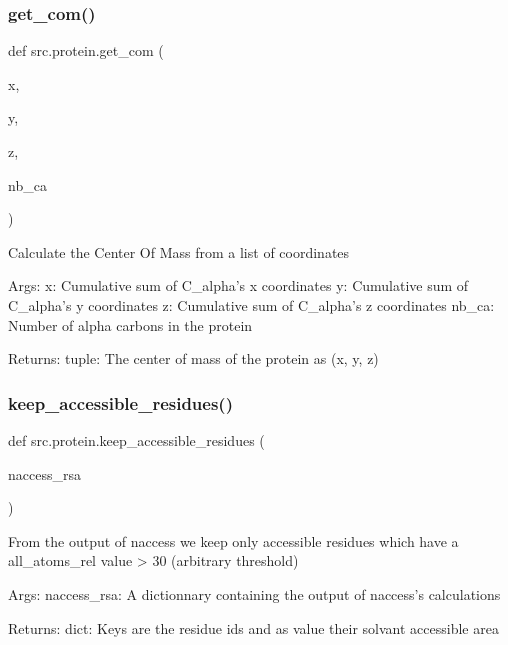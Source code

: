 \subsubsection{\texorpdfstring{get\+\_\+com()}{get\_com()}}
{\footnotesize\ttfamily def src.\+protein.\+get\+\_\+com (\begin{DoxyParamCaption}\item[{}]{x,  }\item[{}]{y,  }\item[{}]{z,  }\item[{}]{nb\+\_\+ca }\end{DoxyParamCaption})}

\begin{DoxyVerb}Calculate the Center Of Mass from a list of coordinates

Args:
    x: Cumulative sum of C_alpha's x coordinates
    y: Cumulative sum of C_alpha's y coordinates
    z: Cumulative sum of C_alpha's z coordinates
    nb_ca: Number of alpha carbons in the protein

Returns:
    tuple: The center of mass of the protein as (x, y, z)\end{DoxyVerb}
 \mbox{\label{namespacesrc_1_1protein_a61ac829ce9a95bc584eb90e83b8463c9}} 
\subsubsection{\texorpdfstring{keep\+\_\+accessible\+\_\+residues()}{keep\_accessible\_residues()}}
{\footnotesize\ttfamily def src.\+protein.\+keep\+\_\+accessible\+\_\+residues (\begin{DoxyParamCaption}\item[{}]{naccess\+\_\+rsa }\end{DoxyParamCaption})}

\begin{DoxyVerb}From the output of naccess we keep only accessible residues
which have a all_atoms_rel value > 30 (arbitrary threshold)

Args:
    naccess_rsa: A dictionnary containing the output of naccess's calculations

Returns:
    dict: Keys are the residue ids and as value their solvant accessible area
\end{DoxyVerb}
 \mbox{\label{namespacesrc_1_1protein_a2f9c9ce10ad76c74e869f4cc0838d6b8}} 
